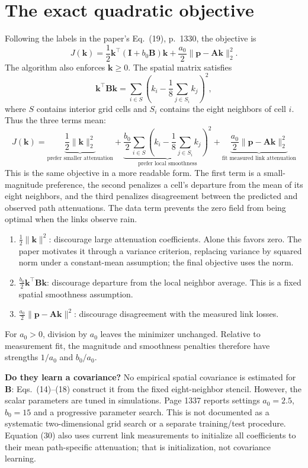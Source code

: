 \documentclass[11pt,a4paper]{article}
\newcommand{\vect}[1]{\mathbf{#1}}
\begin{document}
\section{The exact quadratic objective}
Following the labels in the paper's Eq.~(19), p.~1330, the objective is
\begin{equation}\label{eq:obj}
J(\vect k)=\frac12\vect k^\top(\vect I+b_0\vect B)\vect k
+\frac{a_0}{2}\|\vect p-\vect A\vect k\|_2^2.
\end{equation}
The algorithm also enforces $\vect k\geq0$. The spatial matrix satisfies
\[
\vect k^\top\vect B\vect k
=\sum_{i\in S}\left(k_i-\frac18\sum_{j\in S_i}k_j\right)^2,
\]
where $S$ contains interior grid cells and $S_i$ contains the eight neighbors of cell $i$. Thus the three terms mean:
\[
\boxed{
J(\vect k)=
\underbrace{\frac12\|\vect k\|_2^2}_{\text{prefer smaller attenuation}}
+\underbrace{\frac{b_0}{2}\sum_{i\in S}
\left(k_i-\frac18\sum_{j\in S_i}k_j\right)^2}_{\text{prefer local smoothness}}
+\underbrace{\frac{a_0}{2}\|\vect p-\vect A\vect k\|_2^2}_{\text{fit measured link attenuation}}
}
\]
This is the same objective in a more readable form. The first term is a
small-magnitude preference, the second penalizes a cell's departure from the
mean of its eight neighbors, and the third penalizes disagreement between
the predicted and observed path attenuations. The data term prevents the
zero field from being optimal when the links observe rain.
\begin{enumerate}
\item $\tfrac12\|\vect k\|^2$: discourage large attenuation coefficients. Alone this favors zero. The paper motivates it through a variance criterion, replacing variance by squared norm under a constant-mean assumption; the final objective uses the norm.
\item $\tfrac{b_0}{2}\vect k^\top\vect B\vect k$: discourage departure from the local neighbor average. This is a fixed spatial smoothness assumption.
\item $\tfrac{a_0}{2}\|\vect p-\vect A\vect k\|^2$: discourage disagreement with the measured link losses.
\end{enumerate}
For $a_0>0$, division by $a_0$ leaves the minimizer unchanged. Relative to measurement fit, the magnitude and smoothness penalties therefore have strengths $1/a_0$ and $b_0/a_0$.

\textbf{Do they learn a covariance?} No empirical spatial covariance is estimated for $\vect B$: Eqs.~(14)--(18) construct it from the fixed eight-neighbor stencil. However, the scalar parameters are tuned in simulations. Page 1337 reports settings $a_0=2.5$, $b_0=15$ and a progressive parameter search. This is not documented as a systematic two-dimensional grid search or a separate training/test procedure. Equation (30) also uses current link measurements to initialize all coefficients to their mean path-specific attenuation; that is initialization, not covariance learning.
\end{document}

